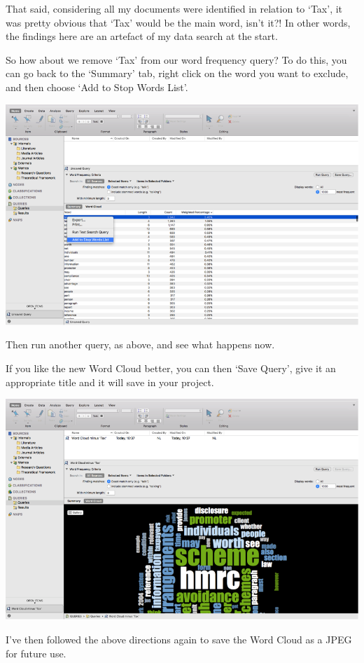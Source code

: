 \documentclass[]{book}
\theoremstyle{definition}
\theoremstyle{definition}
\theoremstyle{definition}
\theoremstyle{remark}
\begin{document}
That said, considering all my documents were identified in relation to
`Tax', it was pretty obvious that `Tax' would be the main word, isn't
it?! In other words, the findings here are an artefact of my data search
at the start.

So how about we remove `Tax' from our word frequency query? To do this,
you can go back to the `Summary' tab, right click on the word you want
to exclude, and then choose `Add to Stop Words List'.

\includegraphics{imgs/qual_28.png}

Then run another query, as above, and see what happens now.

If you like the new Word Cloud better, you can then `Save Query', give
it an appropriate title and it will save in your project.

\includegraphics{imgs/qual_29.png}

I've then followed the above directions again to save the Word Cloud as
a JPEG for future use.
\end{document}
